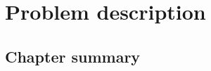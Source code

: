 \chapter{Problem description} \label{chap:problem}

\section*{}


\section{\evm} \label{sec:problem:evm}

\section{Chapter summary}
